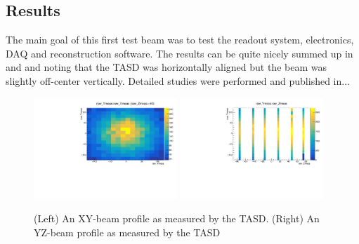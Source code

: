\subsection{Results}

The main goal of this first test beam was to test the readout system, electronics, DAQ and reconstruction software. The results can be quite nicely summed up in  and  and noting that the TASD was horizontally aligned but the beam was slightly off-center vertically. Detailed studies were performed and published in...


\begin{figure}[h!]
\centering
\includegraphics[width=0.48\textwidth]{figures/nuphys/newFigures/beamXYplane1Hadron.pdf}
\includegraphics[width=0.48\textwidth]{figures/nuphys/newFigures/beamYZhadron.pdf}
\caption{(Left) An XY-beam profile as measured by the TASD. (Right) An YZ-beam profile as measured by the TASD}
\label{fig:TASDres2}
\end{figure}

